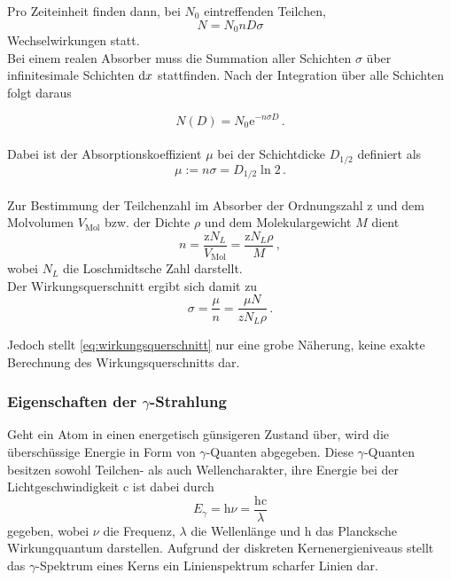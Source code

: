 Pro Zeiteinheit finden dann, bei $N_0$ eintreffenden Teilchen,
\begin{equation}
    N = N_0 n D \sigma
    \label{eq:wechselwirkgamma}
\end{equation}
Wechselwirkungen statt. \\

Bei einem realen Absorber muss die Summation aller Schichten $\sigma$
über infinitesimale Schichten $\mathrm{d} x$ stattfinden.
Nach der Integration über alle Schichten folgt daraus

\begin{equation}
    N(D) = N_0 \mathrm{e}^{-n \sigma D} \,.
    \label{eq:wechselwirkgammaexp}
\end{equation} \\

Dabei ist der Absorptionskoeffizient $\mu$ 
bei der Schichtdicke $D_{1/2}$ definiert als
\begin{equation*}
    \mu := n \sigma = D_{1/2} \ln 2 \,.
\end{equation*} \\

Zur Bestimmung der Teilchenzahl im Absorber der Ordnungszahl $\text{z}$ und
dem Molvolumen $V_{\text{Mol}}$ bzw. der Dichte $\rho$ und dem
Molekulargewicht $M$ dient
\begin{equation*}
    n = \frac{\text{z} N_L}{V_{\text{Mol}}} = \frac{\text{z} N_L \rho}{M} \,,
\end{equation*}
wobei $N_L$ die Loschmidtsche Zahl darstellt. \\

Der Wirkungsquerschnitt ergibt sich damit zu
\begin{equation}
    \sigma = \frac{\mu}{n} = \frac{\mu N}{z N_L \rho} \,.
    \label{eq:wirkungsquerschnitt}
\end{equation}

Jedoch stellt \eqref{eq:wirkungsquerschnitt} nur eine grobe Näherung,
keine exakte Berechnung des Wirkungsquerschnitts dar. \\


\subsubsection*{Eigenschaften der $\gamma$-Strahlung}

Geht ein Atom in einen energetisch günsigeren Zustand über, wird die
überschüssige Energie in Form von $\gamma$-Quanten abgegeben.
Diese $\gamma$-Quanten besitzen sowohl Teilchen- als auch Wellencharakter,
ihre Energie bei der Lichtgeschwindigkeit $\mathrm{c}$ ist dabei durch
\begin{equation*}
    E_\gamma = \mathrm{h} \nu = \frac{\text{h} \mathrm{c}}{\lambda}
\end{equation*}
gegeben, wobei $\nu$ die Frequenz, $\lambda$ die Wellenlänge 
und $\mathrm{h}$ das Plancksche Wirkungquantum darstellen.
Aufgrund der diskreten Kernenergieniveaus stellt das $\gamma$-Spektrum
eines Kerns ein Linienspektrum scharfer Linien dar.


